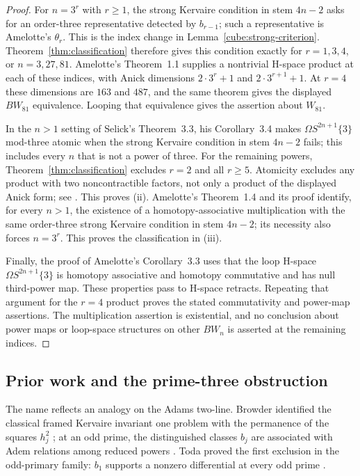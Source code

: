 \documentclass[11pt]{article}
\theoremstyle{definition}
\theoremstyle{remark}
\numberwithin{equation}{section}
\begin{document}
\begin{proof}
For $n=3^r$ with $r\geq1$, the strong Kervaire condition in stem $4n-2$ asks for an order-three representative detected by $b_{r-1}$; such a representative is Amelotte's $\theta_r$. This is the index change in Lemma~\ref{cube:strong-criterion}. Theorem~\ref{thm:classification} therefore gives this condition exactly for $r=1,3,4$, or $n=3,27,81$. Amelotte's Theorem~1.1 \cite{Amelotte} supplies a nontrivial H-space product at each of these indices, with Anick dimensions $2\cdot3^r+1$ and $2\cdot3^{r+1}+1$. At $r=4$ these dimensions are $163$ and $487$, and the same theorem gives the displayed $BW_{81}$ equivalence. Looping that equivalence gives the assertion about $W_{81}$.

In the $n>1$ setting of Selick's Theorem~3.3, his Corollary~3.4 \cite{Selick} makes $\Omega S^{2n+1}\{3\}$ mod-three atomic when the strong Kervaire condition in stem $4n-2$ fails; this includes every $n$ that is not a power of three. For the remaining powers, Theorem~\ref{thm:classification} excludes $r=2$ and all $r\geq5$. Atomicity excludes any product with two noncontractible factors, not only a product of the displayed Anick form; see \cite[Definition~3.1 and its discussion]{Selick}. This proves \textup{(ii)}. Amelotte's Theorem~1.4 and its proof \cite{Amelotte} identify, for every $n>1$, the existence of a homotopy-associative multiplication with the same order-three strong Kervaire condition in stem $4n-2$; its necessity also forces $n=3^r$. This proves the classification in \textup{(iii)}.

Finally, the proof of Amelotte's Corollary~3.3 \cite{Amelotte} uses that the loop H-space $\Omega S^{2n+1}\{3\}$ is homotopy associative and homotopy commutative and has null third-power map. These properties pass to H-space retracts. Repeating that argument for the $r=4$ product proves the stated commutativity and power-map assertions. The multiplication assertion is existential, and no conclusion about power maps or loop-space structures on other $BW_n$ is asserted at the remaining indices.
\end{proof}

\subsection{Prior work and the prime-three obstruction}

The name reflects an analogy on the Adams two-line. Browder identified the classical framed Kervaire invariant one problem with the permanence of the squares $h_j^2$ \cite[Theorem~7.1]{Browder}; at an odd prime, the distinguished classes $b_j$ are associated with Adem relations among reduced powers \cite[Section~1]{Ravenel1978}. Toda proved the first exclusion in the odd-primary family: $b_1$ supports a nonzero differential at every odd prime \cite{TodaRelation}.
\end{document}
